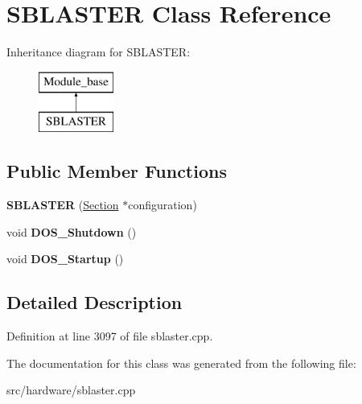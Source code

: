 \hypertarget{classSBLASTER}{\section{S\-B\-L\-A\-S\-T\-E\-R Class Reference}
\label{classSBLASTER}
}
Inheritance diagram for S\-B\-L\-A\-S\-T\-E\-R\-:\begin{figure}[H]
\begin{center}
\leavevmode
\includegraphics[height=2.000000cm]{classSBLASTER}
\end{center}
\end{figure}
\subsection*{Public Member Functions}
\begin{DoxyCompactItemize}
\item 
\hypertarget{classSBLASTER_a2e4295f253cbfbfaf7a09f6958ab884c}{{\bfseries S\-B\-L\-A\-S\-T\-E\-R} (\hyperlink{classSection}{Section} $\ast$configuration)}\label{classSBLASTER_a2e4295f253cbfbfaf7a09f6958ab884c}

\item 
\hypertarget{classSBLASTER_a5914aae53429ba3178b2e88015cffd23}{void {\bfseries D\-O\-S\-\_\-\-Shutdown} ()}\label{classSBLASTER_a5914aae53429ba3178b2e88015cffd23}

\item 
\hypertarget{classSBLASTER_a13b1b3922dde7975afc8da6b0967c569}{void {\bfseries D\-O\-S\-\_\-\-Startup} ()}\label{classSBLASTER_a13b1b3922dde7975afc8da6b0967c569}

\end{DoxyCompactItemize}


\subsection{Detailed Description}


Definition at line 3097 of file sblaster.\-cpp.



The documentation for this class was generated from the following file\-:\begin{DoxyCompactItemize}
\item 
src/hardware/sblaster.\-cpp\end{DoxyCompactItemize}
